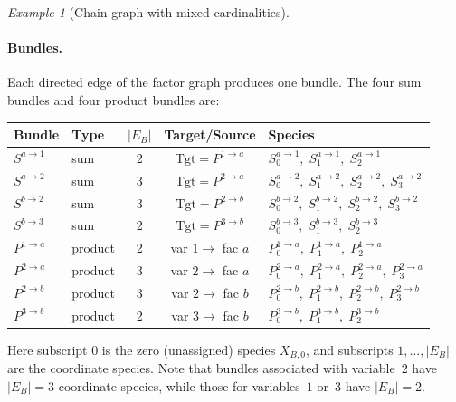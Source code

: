 \documentclass{article}
\theoremstyle{plain}
\theoremstyle{definition}
\theoremstyle{remark}
\newtheorem{example}{Example}[section]
\newcommand{\<}{\langle}
\renewcommand{\>}{\rangle}
\begin{document}
\begin{example}[Chain graph with mixed cardinalities]
 
 
\paragraph{Bundles.}
Each directed edge of the factor graph produces one bundle.
The four sum bundles and four product bundles are:
 
\begin{center}
\renewcommand{\arraystretch}{1.15}
\begin{tabular}{@{}llccl@{}}
\toprule
Bundle & Type & $|E_B|$ & Target/Source & Species \\
\midrule
$S^{a\to 1}$ & sum     & 2 & $\mathrm{Tgt}=P^{1\to a}$ & $S^{a\to 1}_0,\; S^{a\to 1}_1,\; S^{a\to 1}_2$ \\
$S^{a\to 2}$ & sum     & 3 & $\mathrm{Tgt}=P^{2\to a}$ & $S^{a\to 2}_0,\; S^{a\to 2}_1,\; S^{a\to 2}_2,\; S^{a\to 2}_3$ \\
$S^{b\to 2}$ & sum     & 3 & $\mathrm{Tgt}=P^{2\to b}$ & $S^{b\to 2}_0,\; S^{b\to 2}_1,\; S^{b\to 2}_2,\; S^{b\to 2}_3$ \\
$S^{b\to 3}$ & sum     & 2 & $\mathrm{Tgt}=P^{3\to b}$ & $S^{b\to 3}_0,\; S^{b\to 3}_1,\; S^{b\to 3}_2$ \\[3pt]
$P^{1\to a}$ & product & 2 & var $1\to$ fac $a$ & $P^{1\to a}_0,\; P^{1\to a}_1,\; P^{1\to a}_2$ \\
$P^{2\to a}$ & product & 3 & var $2\to$ fac $a$ & $P^{2\to a}_0,\; P^{2\to a}_1,\; P^{2\to a}_2,\; P^{2\to a}_3$ \\
$P^{2\to b}$ & product & 3 & var $2\to$ fac $b$ & $P^{2\to b}_0,\; P^{2\to b}_1,\; P^{2\to b}_2,\; P^{2\to b}_3$ \\
$P^{3\to b}$ & product & 2 & var $3\to$ fac $b$ & $P^{3\to b}_0,\; P^{3\to b}_1,\; P^{3\to b}_2$ \\
\bottomrule
\end{tabular}
\end{center}
 
\noindent
Here subscript $0$ is the zero (unassigned) species $X_{B,0}$, and
subscripts $1,\ldots,|E_B|$ are the coordinate species.
Note that bundles associated with variable~$2$ have
$|E_B|=3$ coordinate species, while those for variables~$1$ or~$3$ have $|E_B|=2$.
 
 

\end{example}
\end{document}
